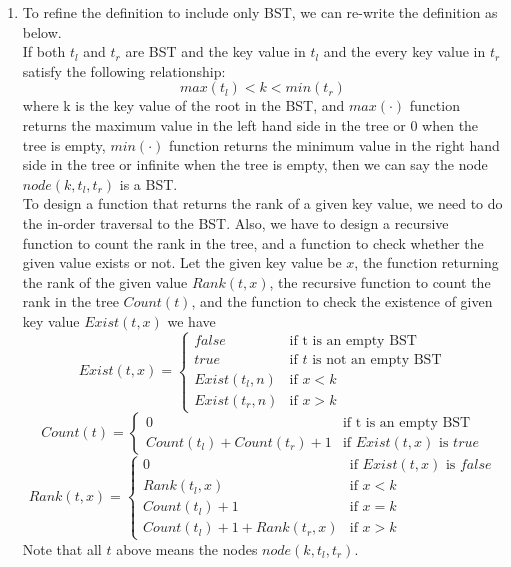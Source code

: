 \documentclass[a4paper,12pt]{article}
\begin{document}
\begin{enumerate}

\item {
To refine the definition to include only BST, we can re-write the definition as below. \\
If both $t_l$ and $t_r$ are BST and the key value in $t_l$ and the every key value in $t_r$ satisfy the following relationship: \\
\[
max(t_l) < k < min(t_r)
\]
where k is the key value of the root in the BST, and $max(\cdot)$ function returns the maximum value in the left hand side in the tree or 0 when the tree is empty, $min(\cdot)$ function returns the minimum value in the right hand side in the tree or infinite when the tree is empty, then we can say the node $node(k,t_l,t_r)$ is a BST. \\
To design a function that returns the rank of a given key value, we need to do the in-order traversal to the BST. Also, we have to design a recursive function to count the rank in the tree, and a function to check whether the given value exists or not. Let the given key value be $x$, the function returning the rank of the given value $Rank(t,x)$, the recursive function to count the rank in the tree $Count(t)$, and the function to check the existence of given key value $Exist(t,x)$ we have \\
\[
Exist(t,x) = 
\begin{cases}
false & \text{if t is an empty BST} \\
true & \text{if $t$ is not an empty BST} \\
Exist(t_l,n) & \text{if $x<k$} \\
Exist(t_r,n) & \text{if $x>k$}
\end{cases} 
\]
\[
Count(t) = 
\begin{cases}
0 & \text{if t is an empty BST} \\
Count(t_l) + Count(t_r) + 1 & \text{if $Exist(t,x)$ is $true$}
\end{cases}
\]
\[
Rank(t,x) = 
\begin{cases}
0 & \text{if $Exist(t,x)$ is $false$} \\
Rank(t_l,x) & \text{if $x<k$} \\
Count(t_l) + 1 & \text{if $x = k$} \\
Count(t_l) + 1 + Rank(t_r,x) & \text{if $x > k$}
\end{cases}
\]
Note that all $t$ above means the nodes $node(k,t_l,t_r)$.

} %


\end{enumerate}
\end{document}
